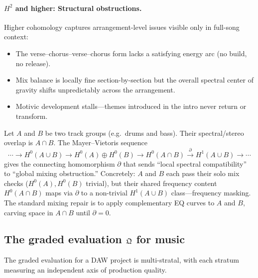 \paragraph{$H^2$ and higher: Structural obstructions.}
Higher cohomology captures arrangement-level issues visible only in
full-song context:
\begin{itemize}
  \item The verse--chorus--verse--chorus form lacks a satisfying
        energy arc (no build, no release).
  \item Mix balance is locally fine section-by-section but the
        overall spectral center of gravity shifts
        unpredictably across the arrangement.
  \item Motivic development stalls---themes introduced in the
        intro never return or transform.
\end{itemize}

\begin{proposition}
\label{prop:mv-mixing}
Let $A$ and $B$ be two track groups (e.g.\ drums and bass).  Their
spectral/stereo overlap is $A \cap B$.  The Mayer--Vietoris
sequence
\[
  \cdots \to H^0(A \cup B) \to H^0(A) \oplus H^0(B)
  \to H^0(A \cap B) \xrightarrow{\;\partial\;}
  H^1(A \cup B) \to \cdots
\]
gives the connecting homomorphism $\partial$ that sends ``local
spectral compatibility'' to ``global mixing obstruction.''
Concretely: $A$ and $B$ each pass their solo mix checks
($H^0(A), H^0(B)$ trivial), but their shared frequency content
$H^0(A \cap B)$ maps via $\partial$ to a non-trivial $H^1(A \cup
B)$ class---frequency masking.  The standard mixing repair is to
apply complementary EQ curves to $A$ and $B$, carving space in
$A \cap B$ until $\partial = 0$.
\end{proposition}

\subsection{The graded evaluation \texorpdfstring{$\mathfrak{Q}$}{Q} for
  music}
\label{ssec:musical-grading}

The graded evaluation for a DAW project is multi-stratal, with
each stratum measuring an independent axis of production quality.

